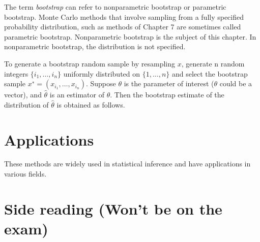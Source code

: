\documentclass[
  letterpaper,
  DIV=11,
  numbers=noendperiod]{scrreprt}
\begin{document}
The term \emph{bootstrap} can refer to nonparametric bootstrap or
parametric bootstrap. Monte Carlo methods that involve sampling from a
fully specified probability distribution, such as methods of Chapter 7
are sometimes called parametric bootstrap. Nonparametric bootstrap is
the subject of this chapter. In nonparametric bootstrap, the
distribution is not specified.

To generate a bootstrap random sample by resampling \(x\), generate n
random integers \(\{i_1,\dots, i_n\}\) uniformly distributed on
\(\{1,\dots , n\}\) and select the bootstrap sample
\(x^∗ = (x_{i_1} ,\dots, x_{i_n} )\). Suppose \(\theta\) is the
parameter of interest (\(\theta\) could be a vector), and
\(\hat \theta\) is an estimator of \(\theta\). Then the bootstrap
estimate of the distribution of \(\hat \theta\) is obtained as follows.

\section{Applications}\label{applications}

These methods are widely used in statistical inference and have
applications in various fields.

\section{Side reading (Won't be on the
exam)}\label{side-reading-wont-be-on-the-exam}
\end{document}
